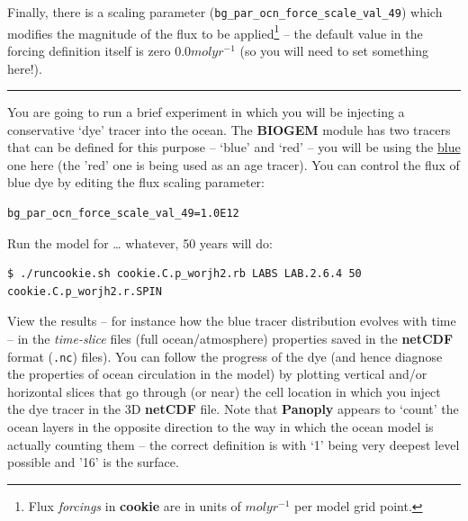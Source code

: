 Finally, there is a scaling parameter (\texttt{\small bg\_par\_ocn\_force\_scale\_val\_49}) which modifies the magnitude of the flux to be applied\footnote{Flux \textit{forcings} in \textbf{cookie} are in units of \(mol yr^{-1}\) per model grid point.} -- the default value in the forcing definition itself is zero \(0.0 mol yr^{-1}\) (so you will need to set something here!).

\vspace{1mm}\noindent\rule{4cm}{0.5pt}\vspace{2mm}

\newpage

\noindent You are going to run a brief experiment in which you will be injecting a conservative ‘dye’ tracer into the ocean. The \textbf{BIOGEM} module has two tracers that can be defined for this purpose – ‘blue’ and ‘red’ -- you will be using the \uline{blue} one here (the 'red' one is being used as an age tracer). You can control the flux of blue dye by editing the flux scaling parameter:

\vspace{-2mm}\small\begin{verbatim}
bg_par_ocn_force_scale_val_49=1.0E12
\end{verbatim}\normalsize\vspace{-2mm}

Run the model for … whatever, 50 years will do:

\vspace{-2mm}\small\begin{verbatim}
$ ./runcookie.sh cookie.C.p_worjh2.rb LABS LAB.2.6.4 50 cookie.C.p_worjh2.r.SPIN
\end{verbatim}\normalsize\vspace{-2mm}

\vspace{1mm}
View the results – for instance how the blue tracer distribution evolves with time – in the \textit{time-slice} files (full ocean/atmosphere) properties saved in the \textbf{netCDF} format (\texttt{.nc}) files). You can follow the progress of the dye (and hence diagnose the properties of ocean circulation in the model) by plotting vertical and/or horizontal slices that go through (or near) the cell location in which you inject the dye tracer in the 3D \textbf{netCDF} file. Note that \textbf{Panoply} appears to ‘count’ the ocean layers in the opposite direction to the way in which the ocean model is actually counting them – the correct definition is with ‘1’ being very deepest level possible and '16' is the surface.

